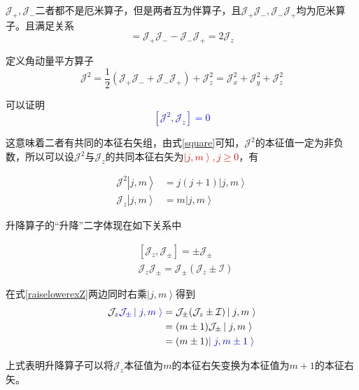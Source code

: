 \documentclass[UTF8,12pt]{article}
\providecommand\Ket[1]{\left|\right. #1 \left.\right\rangle}
\numberwithin{equation}{subsection}
\providecommand{\empB}[1]{\textcolor{blue}{#1}}
\providecommand{\empR}[1]{\textcolor{red}{#1}}
\begin{document}
	$\mathcal J_+,\mathcal J_-$二者都不是厄米算子，但是两者互为伴算子，且$\mathcal J_+\mathcal J_-,\mathcal J_-\mathcal J_+$均为厄米算子。且满足关系\begin{equation}
		[\mathcal J_+,\mathcal J_-] = \mathcal J_+\mathcal J_--\mathcal J_-\mathcal J_+=2\mathcal J_z
		\label{updown}
	\end{equation}
	
	定义角动量平方算子\begin{equation}
		\mathcal J^2 = \frac{1}{2}(\mathcal J_+\mathcal J_-+\mathcal J_-\mathcal J_+)+\mathcal J^2_z=\mathcal J^2_x+\mathcal J^2_y+\mathcal J^2_z
		\label{square}
	\end{equation}
	
	
	可以证明\empB{$$[\mathcal J^2,\mathcal J_z]=0$$}
	
	这意味着二者有共同的本征右矢组，由式\ref{square}可知，$\mathcal J^2$的本征值一定为非负数，所以可以设$\mathcal J^2$与$\mathcal J_z$的共同本征右矢为\empR{$\Ket{j,m},j\geq 0$}，有
	\begin{snugshade}
		\begin{subequations}
			\begin{align}
				\mathcal J^2 \Ket{j,m}&=j(j+1)\Ket{j,m}\label{j}\\
				\mathcal J_z \Ket{j,m}&=m\Ket{j,m}\label{m}
			\end{align}
		\end{subequations}
	\end{snugshade}

	升降算子的“升降”二字体现在如下关系中
	\begin{snugshade}
		\begin{align}
			&[\mathcal J_z,\mathcal J_{\pm}] = \pm \mathcal J_{\pm}\label{raiselowerex}\\
			&\mathcal J_z\mathcal J_\pm = \mathcal J_\pm(\mathcal J_z\pm \mathcal I)\label{raiselowerexZ}
		\end{align}
	\end{snugshade}
	
	在式\ref{raiselowerexZ}两边同时右乘$\Ket{j,m}$得到
	\begin{align*}
		\mathcal J_z\empB{\mathcal J_\pm\Ket{j,m}} &= \mathcal J_\pm(\mathcal J_z\pm \mathcal I)\Ket{j,m}\\
						  &=(m\pm1)\mathcal J_\pm\Ket{j,m}\\
						  &=(m\pm1)\empB{\Ket{j,m\pm1}}
	\end{align*}
	
	上式表明升降算子可以将$\mathcal J_z$本征值为$m$的本征右矢变换为本征值为$m+1$的本征右矢。
	
\end{document}
